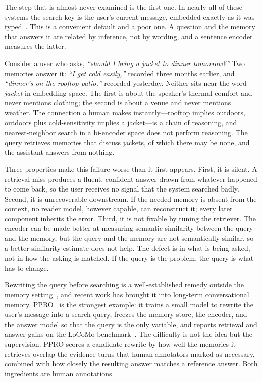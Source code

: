 \documentclass[12pt,letterpaper,oneside]{report}
\begin{document}
The step that is almost never examined is the first one. In nearly all of these
systems the search key is the user's current message, embedded exactly as it
was typed~\cite{mem0}. This is a convenient default and a poor one. A question
and the memory that answers it are related by inference, not by wording, and a
sentence encoder measures the latter.

Consider a user who asks, \emph{``should I bring a jacket to dinner
tomorrow?''} Two memories answer it: \emph{``I get cold easily,''} recorded
three months earlier, and \emph{``dinner's on the rooftop patio,''} recorded
yesterday. Neither sits near the word \emph{jacket} in embedding space. The
first is about the speaker's thermal comfort and never mentions clothing; the
second is about a venue and never mentions weather. The connection a human
makes instantly---rooftop implies outdoors, outdoors plus cold-sensitivity
implies a jacket---is a chain of reasoning, and nearest-neighbor search in a
bi-encoder space does not perform reasoning. The query retrieves memories that
discuss jackets, of which there may be none, and the assistant answers from
nothing.

Three properties make this failure worse than it first appears. First, it is
silent. A retrieval miss produces a fluent, confident answer drawn from
whatever happened to come back, so the user receives no signal that the system
searched badly. Second, it is unrecoverable downstream. If the needed memory is
absent from the context, no reader model, however capable, can reconstruct it;
every later component inherits the error. Third, it is not fixable by tuning
the retriever. The encoder can be made better at measuring semantic similarity
between the query and the memory, but the query and the memory are not
semantically similar, so a better similarity estimate does not help. The defect
is in what is being asked, not in how the asking is matched. If the query is
the problem, the query is what has to change.

Rewriting the query before searching is a well-established remedy outside the
memory setting~\cite{rrr,conqrr,hyde,query2doc}, and recent work has brought it
into long-term conversational memory. PPRO~\cite{ppro} is the strongest example:
it trains a small model to rewrite the user's message into a search query,
freezes the memory store, the encoder, and the answer model so that the query is
the only variable, and reports retrieval and answer gains on the LoCoMo
benchmark~\cite{locomo}. The difficulty is not the idea but the supervision. PPRO
scores a candidate rewrite by how well the memories it retrieves overlap the
evidence turns that human annotators marked as necessary, combined with how
closely the resulting answer matches a reference answer. Both ingredients are
human annotations.
\end{document}
